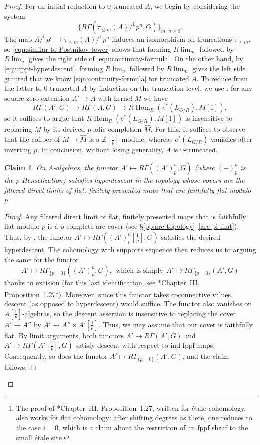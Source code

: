 \documentclass[11pt, reqno]{amsart}
\newcommand{\bL}{\mathbb{L}}
\DeclareMathOperator{\Hom}{Hom}		%
\newcommand{\ra}{\rightarrow}
\newcommand{\wh}{\widehat}
\providecommand{\f}[2]{\frac{#1}{#2}}
\newcommand{\bcl}{\begin{claim}}
\newcommand{\ecl}{\end{claim}}
\newcommand{\x}{\text}
\newcommand{\be}{\begin{equation}}
\newcommand{\ee}{\end{equation}}
\newcommand{\bpf}{\begin{proof}}
\newcommand{\epf}{\end{proof}}
\numberwithin{equation}{numberingbase}
\theoremstyle{thms}
\theoremstyle{claims}
\newtheorem{claim}[equation]{Claim}
\theoremstyle{defs}
\theoremstyle{thms}
\theoremstyle{defs}
\theoremstyle{subsection-tweak}
\theoremstyle{subsection-tweak}
\begin{document}
\begin{proof}
For an initial reduction to $0$-truncated $A$, we begin by considering the system
\[
\{ R\Gamma(\tau_{\le m}(A)/^\bL p^n, G) \}_{m,\, n \ge 0}.
\]
The map $A/^\bL p^n \ra \tau_{\le m}(A)/^\bL p^n$ induces an isomorphism on truncations $\tau_{\le m}$, so \eqref{eqn:similar-to-Postnikov-tower} shows that forming $R\lim_m$ followed by $R\lim_n$ gives the right side of \eqref{eqn:continuity-formula}. On the other hand, by \eqref{eqn:fppf-hyperdescent}, forming $R\lim_n$ followed by $R\lim_m$ gives the left side granted that we know \eqref{eqn:continuity-formula} for truncated $A$. To reduce from the latter to $0$-truncated $A$ by induction on the truncation level, we use : for any square-zero extension $A'\to A$ with kernel $M$ we have
\be \label{def-triangle-eq}
R\Gamma(A', G) \ra R\Gamma(A, G) \ra R\Hom_R(e^*(L_{G/R}), M[1]),
\ee
so it suffices to argue that $R\Hom_R(e^*(L_{G/R}), M[1])$ is insensitive to replacing $M$ by its derived $p$-adic completion $\wh{M}$. For this, it suffices to observe that the cofiber of $M\to \wh{M}$ is a $\mathbb Z[\f 1p]$-module, whereas $e^*(L_{G/R})$ vanishes after inverting $p$. In conclusion, without losing generality, $A$ is $0$-truncated.


\bcl \label{claim:descent}
On $A$-algebras, the functor $A' \mapsto R\Gamma((A')^h_p, G)$ (where $(-)^h_p$ is the $p$-Henselization) 
satisfies hyperdescent in the topology whose covers are the filtered direct limits of flat, finitely presented maps that are faithfully flat modulo $p$.
\ecl

\bpf
Any filtered direct limit of flat, finitely presented maps that is faithfully flat modulo $p$ is a $p$-complete arc cover (see \S\ref{pp:arc-topology}~\ref{arc-pi-fflat}). Thus, by , the functor $A' \mapsto R\Gamma((A')^h_p[\f 1p], G)$ satisfies the desired hyperdescent. The cohomology with supports sequence then reduces us to arguing the same for the functor 
\be \label{elt-excision}
A' \mapsto R\Gamma_{\{ p = 0\}}((A')^h_p, G), \ \ \x{which is simply}\ \ A' \mapsto R\Gamma_{\{ p = 0\}}(A', G)
\ee
thanks to excision (for this last identification, see \cite{Mil80}*{Chapter~III, Proposition~1.27}\footnote{\label{foot:Milne}The proof of \cite{Mil80}*{Chapter~III, Proposition~1.27}, written for \'{e}tale cohomology, also works for flat cohomology: after shifting degrees as there, one reduces to the case $i = 0$, which is a claim about the restriction of an fppf sheaf to the small \'{e}tale site.}). Moreover, since this functor takes   coconnective values, descent (as opposed to hyperdescent) would suffice. The functor %
also vanishes on $A[\f 1p]$-algebras, so the descent assertion is insensitive to replacing the cover $A' \ra A''$ by $A' \ra A'' \times A'[\f 1p]$. Thus, we may assume that our cover is faithfully flat. By limit arguments, both functors $A' \mapsto R\Gamma(A', G)$ and $A' \mapsto R\Gamma(A'[\f 1p], G)$ satisfy  descent with respect to ind-fppf maps. Consequently, so does the functor $A' \mapsto R\Gamma_{\{ p = 0\}}(A', G)$, and the claim follows.
\epf


\end{proof}
\end{document}
